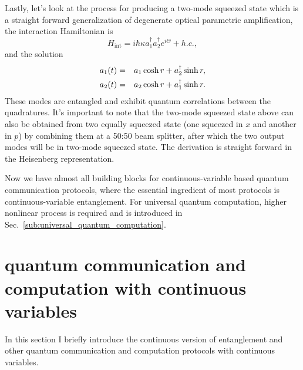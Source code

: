 \documentclass[%
 reprint,
groupedaddress,
showpacs,
 amsmath,amssymb,
 aps,
prb,
]{revtex4-1}
\begin{document}
		Lastly, let's look at the process for producing a two-mode squeezed state which is a straight forward generalization of degenerate optical parametric amplification, the interaction Hamiltonian is
		\begin{equation}
		H_{\mathrm{int}} = i \hbar \kappa a_1^\dagger a_2^\dagger e^{i \Theta} + h.c.,
		\end{equation}
		and the solution
		\begin{eqnarray}
		\label{eqns:two_mode_squeezed}
			a_1 (t) &=& a_1 \cosh r + a_2^\dagger \sinh r,\notag\\
			a_2 (t) &=& a_2 \cosh r + a_1^\dagger \sinh r.
		\end{eqnarray}
		These modes are entangled and exhibit quantum correlations between the quadratures. It's important to note that the two-mode squeezed state above can also be obtained from two equally squeezed state (one squeezed in $x$ and another in $p$) by combining them at a 50:50 beam splitter, after which the two output modes will be in two-mode squeezed state. The derivation is straight forward in the Heisenberg representation.

		Now we have almost all building blocks for continuous-variable based quantum communication protocols, where the essential ingredient of most protocols is continuous-variable entanglement. For universal quantum computation, higher nonlinear process is required and is introduced in Sec.~\ref{sub:universal_quantum_computation}.




\section{quantum communication and computation with continuous variables} %
\label{sec:quantum_communication_and_computation_with_continuous_variables}

	In this section I briefly introduce the continuous version of entanglement and other quantum communication and computation protocols with continuous variables.
\end{document}
